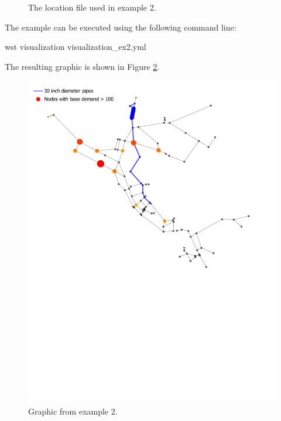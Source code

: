 \begin{figure}[h]
  \caption{The location file used in  example 2.}
  \label{fig:visualization_locations_ex2}
\end{figure}

The example can be executed using the following command line:

\begin{unknownListing}
wst visualization visualization_ex2.yml
\end{unknownListing}

The resulting graphic is shown in Figure \ref{fig:visualization_graphic_ex2}.

\begin{figure}[h]
  \centering
  \includegraphics[scale=0.80]{examples/visualization_ex2.pdf}
  \caption{Graphic from  example 2.}
  \label{fig:visualization_graphic_ex2}
\end{figure}

